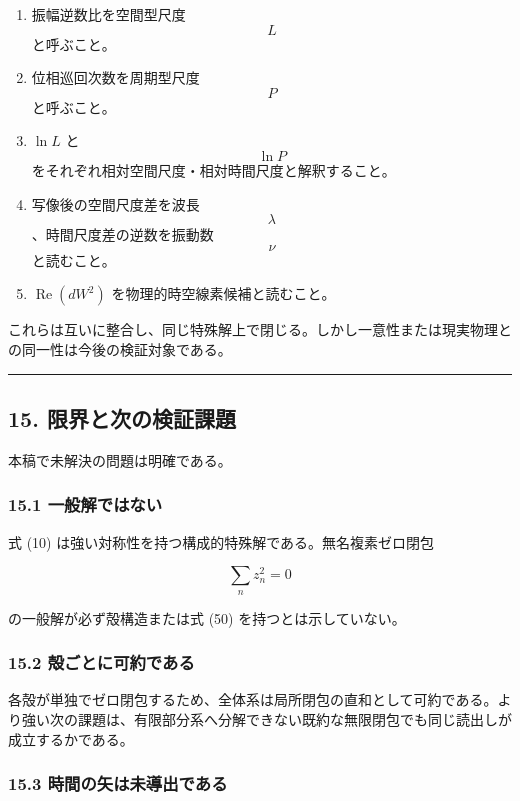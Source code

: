 \documentclass[
  a4paper,
]{ltjsarticle}
\providecommand{\tightlist}{%
  \setlength{\itemsep}{0pt}\setlength{\parskip}{0pt}}
\begin{document}
\begin{enumerate}
\def\labelenumi{\arabic{enumi}.}
\tightlist
\item
  振幅逆数比を空間型尺度 \[L\] と呼ぶこと。
\item
  位相巡回次数を周期型尺度 \[P\] と呼ぶこと。
\item
  \(\ln L\) と \[\ln P\]
  をそれぞれ相対空間尺度・相対時間尺度と解釈すること。
\item
  写像後の空間尺度差を波長 \[\lambda\]、時間尺度差の逆数を振動数 \[\nu\]
  と読むこと。
\item
  \(\operatorname{Re}(dW^2)\) を物理的時空線素候補と読むこと。
\end{enumerate}

これらは互いに整合し、同じ特殊解上で閉じる。しかし一意性または現実物理との同一性は今後の検証対象である。

\begin{center}\rule{0.5\linewidth}{0.5pt}\end{center}

\subsection{15.
限界と次の検証課題}\label{ux9650ux754cux3068ux6b21ux306eux691cux8a3cux8ab2ux984c}

本稿で未解決の問題は明確である。

\subsubsection{15.1
一般解ではない}\label{ux4e00ux822cux89e3ux3067ux306fux306aux3044}

式 (10) は強い対称性を持つ構成的特殊解である。無名複素ゼロ閉包

\[
\sum_n z_n^2=0
\]

の一般解が必ず殻構造または式 (50) を持つとは示していない。

\subsubsection{15.2
殻ごとに可約である}\label{ux6bbbux3054ux3068ux306bux53efux7d04ux3067ux3042ux308b}

各殻が単独でゼロ閉包するため、全体系は局所閉包の直和として可約である。より強い次の課題は、有限部分系へ分解できない既約な無限閉包でも同じ読出しが成立するかである。

\subsubsection{15.3
時間の矢は未導出である}\label{ux6642ux9593ux306eux77e2ux306fux672aux5c0eux51faux3067ux3042ux308b}
\end{document}
